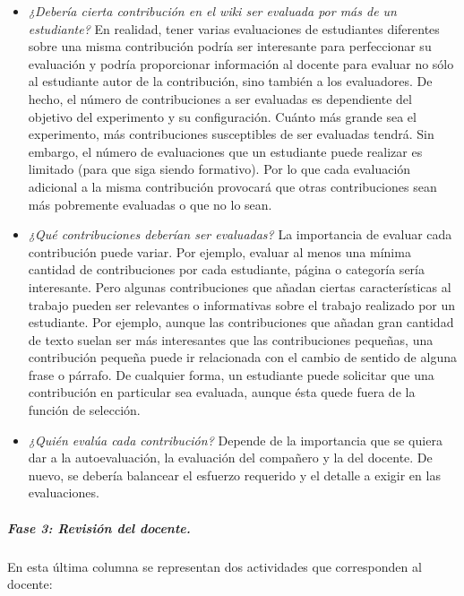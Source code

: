 			\begin{itemize}
				\item \emph{¿Debería cierta contribución en el wiki ser evaluada por más de un estudiante?} En realidad, tener varias evaluaciones de estudiantes diferentes sobre una misma contribución podría ser interesante para perfeccionar su evaluación y podría proporcionar información al docente para evaluar no sólo al estudiante autor de la contribución, sino también a los evaluadores. De hecho, el número de contribuciones a ser evaluadas es dependiente del objetivo del experimento y su configuración. Cuánto más grande sea el experimento, más contribuciones susceptibles de ser evaluadas tendrá. Sin embargo, el número de evaluaciones que un estudiante puede realizar es limitado (para que siga siendo formativo). Por lo que cada evaluación adicional a la misma contribución provocará que otras contribuciones sean más pobremente evaluadas o que no lo sean.
				\item \emph{¿Qué contribuciones deberían ser evaluadas?} La importancia de evaluar cada contribución puede variar. Por ejemplo, evaluar al menos una mínima cantidad de contribuciones por cada estudiante, página o categoría sería interesante. Pero algunas contribuciones que añadan ciertas características al trabajo pueden ser relevantes o informativas sobre el trabajo realizado por un estudiante. Por ejemplo, aunque las contribuciones que añadan gran cantidad de texto suelan ser más interesantes que las contribuciones pequeñas, una contribución pequeña puede ir relacionada con el cambio de sentido de alguna frase o párrafo. De cualquier forma, un estudiante puede solicitar que una contribución en particular sea evaluada, aunque ésta quede fuera de la función de selección.
				\item \emph{¿Quién evalúa cada contribución?} Depende de la importancia que se quiera dar a la autoevaluación, la evaluación del compañero y la del docente. De nuevo, se debería balancear el esfuerzo requerido y el detalle a exigir en las evaluaciones.
			\end{itemize}


			\subparagraph*{Fase 3: Revisión del docente.}

			En esta última columna se representan dos actividades que corresponden al docente:

